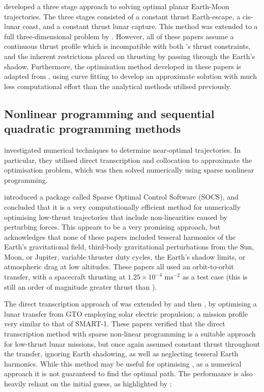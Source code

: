 \textcite{Pierson1994} developed a three stage approach to solving optimal planar Earth-Moon trajectories. The three stages consisted of a constant thrust Earth-escape, a cis-lunar coast, and a constant thrust lunar capture. This method was extended to a full three-dimensional problem by \textcite{Kluever1995,Kluever1996,Kluever1997}. However, all of these papers assume a continuous thrust profile which is incompatible with both \BW's thrust constraints, and the inherent restrictions placed on thrusting by passing through the Earth's shadow. Furthermore, the optimisation method developed in these papers is adapted from \textcite{Edelbaum1964}, using curve fitting to develop an approximate solution with much less computational effort than the analytical methods utilised previously.

\subsection{Nonlinear programming and sequential quadratic programming methods} \label{sub:NLP-lit}


\textcite{Betts1993} investigated numerical techniques to determine near-optimal trajectories. In particular, they utilised direct transcription and collocation to approximate the optimisation problem, which was then solved numerically using sparse nonlinear programming.
 
\textcite{Betts1994} introduced a package called Sparse Optimal Control Software (SOCS), and concluded that it is a very computationally efficient method for numerically optimising low-thrust trajectories that include non-linearities caused by perturbing forces. This appears to be a very promising approach, but \textcite{Betts2000} acknowledges that none of these papers included tesseral harmonics of the Earth's gravitational field, third-body gravitational perturbations from the Sun, Moon, or Jupiter, variable thruster duty cycles, the Earth's shadow limits, or atmospheric drag at low altitudes. These papers all used an orbit-to-orbit transfer, with a spacecraft thrusting
 at $1.25\times10^{-4}\text{ ms}^{-2}$ as a test case (this is still an order of magnitude greater thrust than \BW).

The direct transcription approach of \textcite{Betts1993} was extended by \textcite{Erb_thesis} and then \textcite{Betts2003}, by optimising a lunar transfer from GTO employing solar electric propulsion; a mission profile very similar to that of SMART-1. These papers verified that the direct transcription method with sparse non-linear programming is a suitable approach for low-thrust lunar missions, but once again assumed constant thrust throughout the transfer, ignoring Earth shadowing, as well as neglecting tesseral Earth harmonics. While this method may be useful for optimising \BW, as a numerical approach it is not guaranteed to find the optimal path. The performance is also heavily reliant on the initial guess, as highlighted by \textcite{Betts2003}: 

